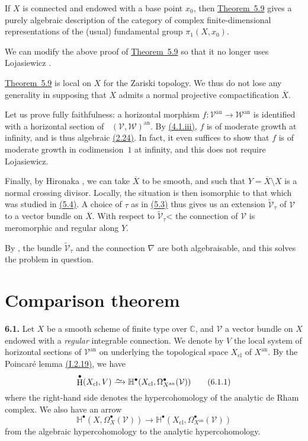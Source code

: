 \documentclass{report}
\newenvironment{rmenv}[1]
  {\phantomsection\par\medskip\noindent\textbf{#1.}\rmfamily}
  {\par\medskip}
\renewcommand{\cal}[1]{{\mathcal{#1}}}
\newcommand{\CC}{\mathbb{C}}
\newcommand{\an}{\mathrm{an}}
\newcommand{\cl}{\mathrm{cl}}
\newcommand{\simto}{\xrightarrow{\raisebox{-0.7ex}[0ex][0ex]{$\sim$}}}
\DeclareMathOperator{\shHom}{\underline{Hom}}
\DeclareMathOperator{\HH}{H}
\newcommand{\oldpage}[1]{\marginpar{\footnotesize$\Big\vert$ \textit{p.~#1}}}
\begin{document}
If $X$ is connected and endowed with a base point $x_0$, then \hyperref[II.5.9]{Theorem~5.9} gives a purely algebraic description of the category of complex finite-dimensional representations of the (usual) fundamental group $\pi_1(X,x_0)$.

We can modify the above proof of \hyperref[II.5.9]{Theorem~5.9} so that it no longer uses Lojasiewicz \cite{17}.

\hyperref[II.5.9]{Theorem~5.9} is local on $X$ for the Zariski topology.
We thus do not lose any generality in supposing that $X$ admits a normal projective compactification $\overline{X}$.

Let us prove fully faithfulness:
\oldpage{98}
a horizontal morphism $f\colon\cal{V}^\an\to\cal{W}^\an$ is identified with a horizontal section of $\shHom(\cal{V},\cal{W})^\an$.
By \hyperref[II.4.1]{(4.1.iii)}, $f$ is of moderate growth at infinity, and is thus algebraic \hyperref[II.2.24]{(2.24)}.
In fact, it even suffices to show that $f$ is of moderate growth in codimension~$1$ at infinity, and this does not require Lojasiewicz.

Finally, by Hironaka \cite{12}, we can take $\overline{X}$ to be smooth, and such that $Y=\overline{X}\setminus X$ is a normal crossing divisor.
Locally, the situation is then isomorphic to that which was studied in \hyperref[II.5.4]{(5.4)}.
A choice of $\tau$ as in \hyperref[II.5.3]{(5.3)} thus gives us an extension $\widetilde{\cal{V}}_\tau$ of $\cal{V}$ to a vector bundle on $\overline{X}$.
With respect to $\widetilde{\cal{V}}_\tau$< the connection of $\cal{V}$ is meromorphic and regular along $Y$.

By \cite{GAGA}, the bundle $\widetilde{\cal{V}}_\tau$ and the connection $\nabla$ are both algebraisable, and this solves the problem in question.



\section{Comparison theorem}
\label{II.6}

\begin{rmenv}{6.1}
\label{II.6.1}
  Let $X$ be a smooth scheme of finite type over $\CC$, and $\cal{V}$ a vector bundle on $X$ endowed with a \emph{regular} integrable connection.
  We denote by $V$ the local system of horizontal sections of $\cal{V}^\an$ on underlying the topological space $X_\cl$ of $X^\an$.
  By the Poincaré lemma \hyperref[I.2.19]{(I.2.19)}, we have
  \[
  \label{II.6.1.1}
    \HH^\bullet(X_\cl,V)
    \simto \mathbb{H}^\bullet(X_\cl,\Omega_{X^\an}^\bullet(\cal{V}))
  \tag{6.1.1}
  \]
  where the right-hand side denotes the hypercohomology of the analytic de Rham complex.
  We also have an arrow
  \[
  \label{II.6.1.2}
    \mathbb{H}^\bullet(X,\Omega_X^\bullet(\cal{V}))
    \to \mathbb{H}^\bullet(X_\cl,\Omega_{X^\an}^\bullet(\cal{V}))
  \tag{6.1.2}
  \]
  from the algebraic hypercohomology to the analytic hypercohomology.
\end{rmenv}
\end{document}
